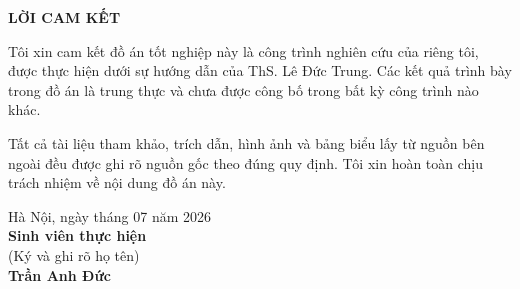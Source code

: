 \documentclass[../DoAn.tex]{subfiles}
\begin{document}
\thispagestyle{empty}

\begin{center}
    \textbf{\large LỜI CAM KẾT}
\end{center}

\vspace{1cm}

Tôi xin cam kết đồ án tốt nghiệp này là công trình nghiên cứu của riêng tôi, được thực hiện dưới sự hướng dẫn của ThS.
Lê Đức Trung.
Các kết quả trình bày trong đồ án là trung thực và chưa được công bố trong bất kỳ công trình nào khác.

Tất cả tài liệu tham khảo, trích dẫn, hình ảnh và bảng biểu lấy từ nguồn bên ngoài đều được ghi rõ nguồn gốc theo đúng quy định.
Tôi xin hoàn toàn chịu trách nhiệm về nội dung đồ án này.

\vspace{3cm}

\begin{flushright}
    Hà Nội, ngày \quad\quad tháng 07 năm 2026\\[1cm]
    \textbf{Sinh viên thực hiện}\\[0.4cm]
    (Ký và ghi rõ họ tên)\\[2.5cm]
    \textbf{Trần Anh Đức}
\end{flushright}
\end{document}
